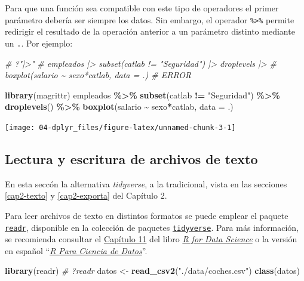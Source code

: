 \documentclass[
]{book}
\newenvironment{Shaded}{\begin{snugshade}}{\end{snugshade}}
\newcommand{\AttributeTok}[1]{\textcolor[rgb]{0.13,0.29,0.53}{#1}}
\newcommand{\CommentTok}[1]{\textcolor[rgb]{0.56,0.35,0.01}{\textit{#1}}}
\newcommand{\FunctionTok}[1]{\textcolor[rgb]{0.13,0.29,0.53}{\textbf{#1}}}
\newcommand{\NormalTok}[1]{#1}
\newcommand{\OtherTok}[1]{\textcolor[rgb]{0.56,0.35,0.01}{#1}}
\newcommand{\SpecialCharTok}[1]{\textcolor[rgb]{0.81,0.36,0.00}{\textbf{#1}}}
\newcommand{\StringTok}[1]{\textcolor[rgb]{0.31,0.60,0.02}{#1}}
\begin{document}
Para que una función sea compatible con este tipo de operadores el primer parámetro debería ser siempre los datos.
Sin embargo, el operador \texttt{\%\textgreater{}\%} permite redirigir el resultado de la operación anterior a un parámetro distinto mediante un \texttt{.}.
Por ejemplo:

\begin{Shaded}
\begin{Highlighting}[]
\CommentTok{\# ?"|\textgreater{}"}
\CommentTok{\# empleados |\textgreater{} subset(catlab != "Seguridad") |\textgreater{} droplevels |\textgreater{} }
\CommentTok{\#     boxplot(salario \textasciitilde{} sexo*catlab, data = .) \# ERROR}

\FunctionTok{library}\NormalTok{(magrittr)}
\NormalTok{empleados }\SpecialCharTok{\%\textgreater{}\%} 
  \FunctionTok{subset}\NormalTok{(catlab }\SpecialCharTok{!=} \StringTok{"Seguridad"}\NormalTok{) }\SpecialCharTok{\%\textgreater{}\%}
  \FunctionTok{droplevels}\NormalTok{() }\SpecialCharTok{\%\textgreater{}\%}
  \FunctionTok{boxplot}\NormalTok{(salario }\SpecialCharTok{\textasciitilde{}}\NormalTok{ sexo}\SpecialCharTok{*}\NormalTok{catlab, }\AttributeTok{data =}\NormalTok{ .)}
\end{Highlighting}
\end{Shaded}

\begin{center}\texttt{[image: 04-dplyr\_files/figure-latex/unnamed-chunk-3-1]} \end{center}

\subsection{Lectura y escritura de archivos de texto}\label{readr}

En esta seccón la alternativa \emph{tidyverse}, a la tradicional, vista en las secciones \ref{cap2-texto} y \ref{cap2-exporta} del Capítulo 2.

Para leer archivos de texto en distintos formatos se puede emplear el paquete \href{https://readr.tidyverse.org}{\texttt{readr}}, disponible en la colección de paquetes \href{https://tidyverse.tidyverse.org}{\texttt{tidyverse}}. Para más información, se recomienda consultar el \href{https://r4ds.had.co.nz/data-import.html}{Capítulo 11} del libro \href{http://r4ds.had.co.nz}{\emph{R for Data Science}} \citep{wickham2023r} o la versión en español ``\href{https://es.r4ds.hadley.nz/}{\emph{R Para Ciencia de Datos}}''.

\begin{Shaded}
\begin{Highlighting}[]
\FunctionTok{library}\NormalTok{(readr)}
\CommentTok{\# ?readr}
\NormalTok{datos }\OtherTok{\textless{}{-}} \FunctionTok{read\_csv2}\NormalTok{(}\StringTok{"./data/coches.csv"}\NormalTok{)}
\FunctionTok{class}\NormalTok{(datos) }
\end{Highlighting}
\end{Shaded}
\end{document}
